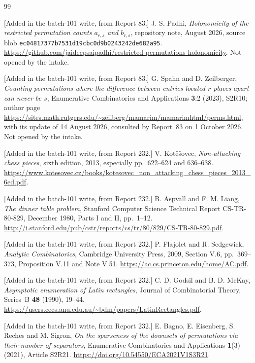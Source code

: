 \documentclass[11pt]{article}
\numberwithin{equation}{section}
\theoremstyle{definition}
\theoremstyle{remark}
\theoremstyle{definition}
\begin{document}
\begin{thebibliography}{99}
\begingroup\raggedright
[Added in the batch-101 write, from Report 83.] J. S. Padhi,
\emph{Holonomicity of the restricted permutation counts $a_{r,s}$ and
$b_{r,s}$}, repository note, August 2026, source blob
\nolinkurl{ec04817377b7531d19cbc0d9b0243242de682a95}.
\url{https://github.com/jaideepsaipadhi/restricted-permutations-holonomicity}.
Not opened by the intake.\par\endgroup

\begingroup\raggedright
[Added in the batch-101 write, from Report 83.] G. Spahn and
D. Zeilberger, \emph{Counting permutations where the difference between
entries located $r$ places apart can never be $s$}, Enumerative
Combinatorics and Applications \textbf{3}:2 (2023), S2R10; author page
\url{https://sites.math.rutgers.edu/~zeilberg/mamarim/mamarimhtml/perms.html},
with its update of 14 August 2026, consulted by Report~83 on 1 October 2026.
Not opened by the intake.\par\endgroup

\begingroup\raggedright
[Added in the batch-101 write, from Report 232.] V. Kot\v e\v sovec,
\emph{Non-attacking chess pieces}, sixth edition, 2013, especially
pp.~622--624 and 636--638.
\url{https://www.kotesovec.cz/books/kotesovec_non_attacking_chess_pieces_2013_6ed.pdf}.\par\endgroup

\begingroup\raggedright
[Added in the batch-101 write, from Report 232.] B. Aspvall and
F. M. Liang, \emph{The dinner table problem}, Stanford Computer Science
Technical Report CS-TR-80-829, December 1980, Parts I and II, pp.~1--12.
\url{http://i.stanford.edu/pub/cstr/reports/cs/tr/80/829/CS-TR-80-829.pdf}.\par\endgroup

[Added in the batch-101 write, from Report 232.] P. Flajolet and
R. Sedgewick, \emph{Analytic Combinatorics}, Cambridge University Press,
2009, Section V.6, pp.~369--373, Proposition V.11 and Note V.51.
\url{https://ac.cs.princeton.edu/home/AC.pdf}.

[Added in the batch-101 write, from Report 232.] C. D. Godsil and
B. D. McKay, \emph{Asymptotic enumeration of Latin rectangles}, Journal of
Combinatorial Theory, Series~B \textbf{48} (1990), 19--44.
\url{https://users.cecs.anu.edu.au/~bdm/papers/LatinRectangles.pdf}.

[Added in the batch-101 write, from Report 232.] E. Bagno, E. Eisenberg,
S. Reches and M. Sigron, \emph{On the sparseness of the downsets of
permutations via their number of separators}, Enumerative Combinatorics and
Applications \textbf{1}(3) (2021), Article S2R21.
\url{https://doi.org/10.54550/ECA2021V1S3R21}.


\end{thebibliography}
\end{document}
